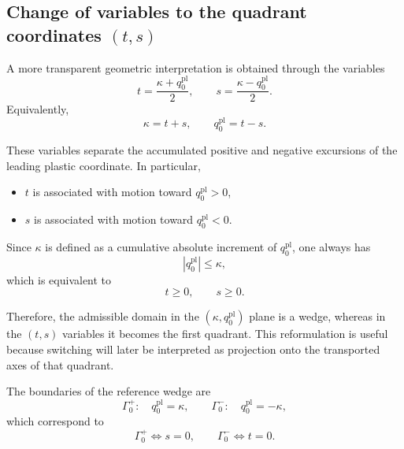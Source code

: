 \documentclass[11pt,a4paper]{article}
\begin{document}
\subsection{Change of variables to the quadrant coordinates \texorpdfstring{$(t,s)$}{(t,s)}}

A more transparent geometric interpretation is obtained through the variables
\begin{equation}
t
=
\frac{\kappa + q^{\mathrm{pl}}_0}{2},
\qquad
s
=
\frac{\kappa - q^{\mathrm{pl}}_0}{2}.
\label{eq:ts_definition_transport_ref}
\end{equation}
Equivalently,
\begin{equation}
\kappa = t+s,
\qquad
q^{\mathrm{pl}}_0 = t-s.
\label{eq:kappa_q0_from_ts_transport_ref}
\end{equation}

These variables separate the accumulated positive and negative excursions of the leading plastic coordinate. In particular,
\begin{itemize}
\item \(t\) is associated with motion toward \(q^{\mathrm{pl}}_0>0\),
\item \(s\) is associated with motion toward \(q^{\mathrm{pl}}_0<0\).
\end{itemize}

Since \(\kappa\) is defined as a cumulative absolute increment of \(q^{\mathrm{pl}}_0\), one always has
\begin{equation}
|q^{\mathrm{pl}}_0| \le \kappa,
\label{eq:wedge_constraint_transport_ts_ref}
\end{equation}
which is equivalent to
\begin{equation}
t \ge 0,
\qquad
s \ge 0.
\label{eq:ts_nonnegative_transport_ref}
\end{equation}

Therefore, the admissible domain in the \((\kappa,q^{\mathrm{pl}}_0)\) plane is a wedge, whereas in the \((t,s)\) variables it becomes the first quadrant. This reformulation is useful because switching will later be interpreted as projection onto the transported axes of that quadrant.

The boundaries of the reference wedge are
\begin{equation}
\Gamma_0^{+}:\quad q^{\mathrm{pl}}_0=\kappa,
\qquad
\Gamma_0^{-}:\quad q^{\mathrm{pl}}_0=-\kappa,
\label{eq:reference_wedge_transport_ts_ref}
\end{equation}
which correspond to
\begin{equation}
\Gamma_0^{+} \iff s=0,
\qquad
\Gamma_0^{-} \iff t=0.
\label{eq:wedge_walls_ts_transport_ref}
\end{equation}
\end{document}
